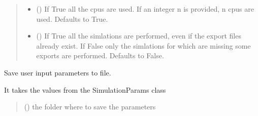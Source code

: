 \documentclass[letterpaper,10pt,english]{sphinxmanual}
\begin{document}
\begin{fulllineitems}
\begin{fulllineitems}
\begin{quote}
\begin{description}
\begin{itemize}
\item {} 
\sphinxAtStartPar
{} (\sphinxstyleliteralemphasis{\sphinxupquote{, }}) \textendash{} If True all the cpus are used. If an integer n is provided, n cpus are used. Defaults to True.

\item {} 
\sphinxAtStartPar
{} (\sphinxstyleliteralemphasis{\sphinxupquote{, }}) \textendash{} If True all the simlations are performed, even if the export files already exist. If False only the simlations for which are missing some exports are performed. Defaults to False.

\end{itemize}

\end{description}\end{quote}

\end{fulllineitems}


\begin{fulllineitems}
\label{\detokenize{API:raypyng.simulate.Simulate.save_parameters_to_file}}
\pysigstartsignatures
{}
\pysigstopsignatures
\sphinxAtStartPar
Save user input parameters to file.

\sphinxAtStartPar
It takes the values from the SimulationParams class
\begin{quote}\begin{description}
\sphinxAtStartPar
{} () \textendash{} the folder where to save the parameters

\end{description}\end{quote}

\end{fulllineitems}



\end{fulllineitems}
\end{document}
